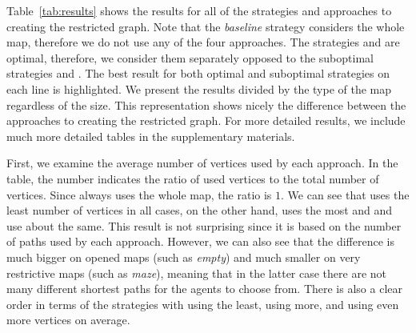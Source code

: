 %
Table~\ref{tab:results} shows the results for all of the strategies and approaches to creating the restricted graph. Note that the \emph{baseline} strategy \ssb{} considers the whole map, therefore we do not use any of the four approaches. The strategies \ssb{} and \ssp{} are optimal, therefore, we consider them separately opposed to the suboptimal strategies \ssc{} and \ssm{}. The best result for both optimal and suboptimal strategies on each line is highlighted. We present the results divided by the type of the map regardless of the size. This representation shows nicely the difference between the approaches to creating the restricted graph. For more detailed results, we include much more detailed tables in the supplementary materials.

First, we examine the average number of vertices used by each approach. In the table, the number indicates the ratio of used vertices to the total number of vertices. Since \ssb{} always uses the whole map, the ratio is $1$. We can see that \pss{} uses the least number of vertices in all cases, on the other hand, \psa{} uses the most and \psd{} and \psr{} use about the same. This result is not surprising since it is based on the number of paths used by each approach. However, we can also see that the difference is much bigger on opened maps (such as \emph{empty}) and much smaller on very restrictive maps (such as \emph{maze}), meaning that in the latter case there are not many different shortest paths for the agents to choose from. There is also a clear order in terms of the strategies with \ssp{} using the least, \ssc{} using more, and \ssm{} using even more vertices on average.

